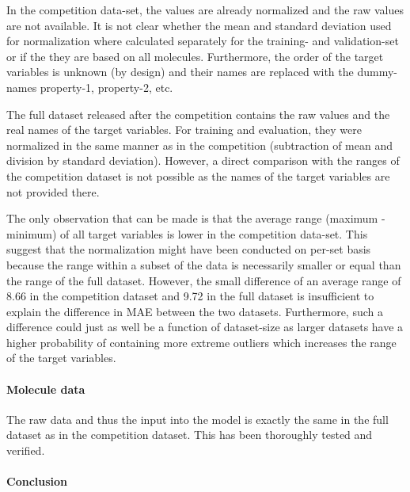 In the competition data-set, the values are already normalized and the raw values are not available. It is not clear whether the mean and standard deviation used for normalization where calculated separately for the training- and validation-set or if the they are based on all molecules. Furthermore, the order of the target variables is unknown (by design) and their names are replaced with the dummy-names property-1, property-2, etc.

The full dataset released after the competition contains the raw values and the real names of the target variables. For training and evaluation, they were normalized in the same manner as in the competition (subtraction of mean and division by standard deviation). However, a direct comparison with the ranges of the competition dataset is not possible as the names of the target variables are not provided there. 

The only observation that can be made is that the average range (maximum - minimum) of all target variables is lower in the competition data-set. This suggest that the normalization might have been conducted on per-set basis because the range within a subset of the data is necessarily smaller or equal than the range of the full dataset. However, the small difference of an average range of 8.66 in the competition dataset and 9.72 in the full dataset is insufficient to explain the difference in MAE between the two datasets. Furthermore, such a difference could just as well be a function of dataset-size as larger datasets have a higher probability of containing more extreme outliers which increases the range of the target variables.

\paragraph{Molecule data}

The raw data and thus the input into the model is exactly the same in the full dataset as in the competition dataset. This has been thoroughly tested and verified.

\paragraph{Conclusion}

